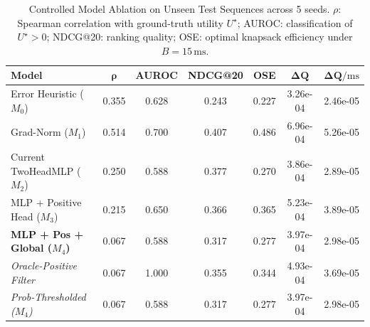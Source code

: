 \begin{table}[t]
\centering
\small
\caption{Controlled Model Ablation on Unseen Test Sequences across 5 seeds. $\rho$: Spearman correlation with ground-truth utility $U^\star$; AUROC: classification of $U^\star > 0$; NDCG@20: ranking quality; OSE: optimal knapsack efficiency under $B=15\,\mathrm{ms}$.}
\label{tab:model_ablation}
\begin{tabular}{lcccccc}
\toprule
\textbf{Model} & $\bm{\rho}$ & \textbf{AUROC} & \textbf{NDCG@20} & \textbf{OSE} & $\bm{\Delta Q}$ & $\bm{\Delta Q / \mathrm{ms}}$ \\
\midrule
Error Heuristic ($M_0$) & 0.355 & 0.628 & 0.243 & 0.227 & 3.26e-04 & 2.46e-05 \\
Grad-Norm ($M_1$) & 0.514 & 0.700 & 0.407 & 0.486 & 6.96e-04 & 5.26e-05 \\
Current TwoHeadMLP ($M_2$) & 0.250 & 0.588 & 0.377 & 0.270 & 3.86e-04 & 2.89e-05 \\
MLP + Positive Head ($M_3$) & 0.215 & 0.650 & 0.366 & 0.365 & 5.23e-04 & 3.89e-05 \\
\textbf{MLP + Pos + Global ($M_4$)} & 0.067 & 0.588 & 0.317 & 0.277 & 3.97e-04 & 2.98e-05 \\
\textit{Oracle-Positive Filter} & 0.067 & 1.000 & 0.355 & 0.344 & 4.93e-04 & 3.69e-05 \\
\textit{Prob-Thresholded ($M_4$)} & 0.067 & 0.588 & 0.317 & 0.277 & 3.97e-04 & 2.98e-05 \\
\bottomrule
\end{tabular}
\end{table}
